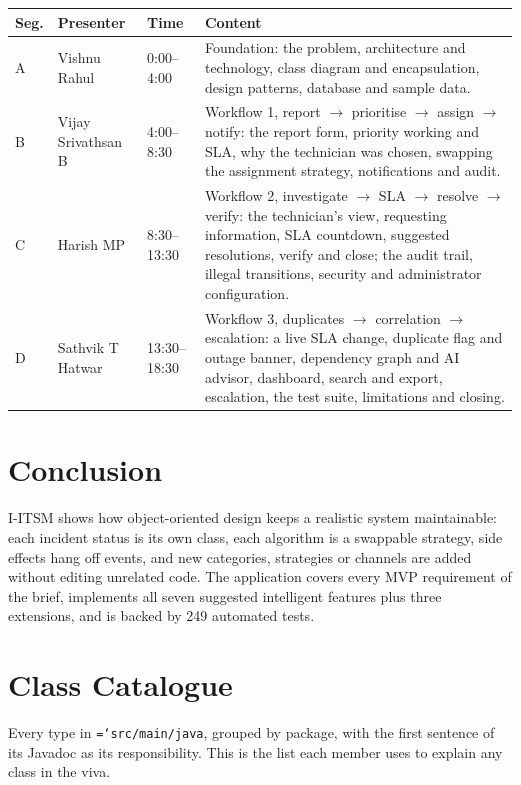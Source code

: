 \documentclass[11pt,a4paper]{article}
\newcommand{\code}[1]{\texttt{\hyphenchar\font=`\-\relax #1}}
\begin{document}
\begin{tabularx}{\linewidth}{@{}L{0.9cm}L{3.3cm}L{2.1cm}Y@{}}
\toprule
\textbf{Seg.} & \textbf{Presenter} & \textbf{Time} & \textbf{Content} \\
\midrule
A & Vishnu Rahul & 0:00--4:00 & Foundation: the problem, architecture and technology, class diagram and encapsulation, design patterns, database and sample data. \\
B & Vijay Srivathsan B & 4:00--8:30 & Workflow 1, report $\rightarrow$ prioritise $\rightarrow$ assign $\rightarrow$ notify: the report form, priority working and SLA, why the technician was chosen, swapping the assignment strategy, notifications and audit. \\
C & Harish MP & 8:30--13:30 & Workflow 2, investigate $\rightarrow$ SLA $\rightarrow$ resolve $\rightarrow$ verify: the technician's view, requesting information, SLA countdown, suggested resolutions, verify and close; the audit trail, illegal transitions, security and administrator configuration. \\
D & Sathvik T Hatwar & 13:30--18:30 & Workflow 3, duplicates $\rightarrow$ correlation $\rightarrow$ escalation: a live SLA change, duplicate flag and outage banner, dependency graph and AI advisor, dashboard, search and export, escalation, the test suite, limitations and closing. \\
\bottomrule
\end{tabularx}

\section{Conclusion}
I-ITSM shows how object-oriented design keeps a realistic system maintainable: each incident status is its own class, each algorithm is a swappable strategy, side effects hang off events, and new categories, strategies or channels are added without editing unrelated code. The application covers every MVP requirement of the brief, implements all seven suggested intelligent features plus three extensions, and is backed by 249 automated tests.

\clearpage
\appendix
\renewcommand{\thesection}{\Alph{section}}
\section{Class Catalogue}\label{app:classes}
Every type in \code{src/main/java}, grouped by package, with the first sentence of its Javadoc as its responsibility. This is the list each member uses to explain any class in the viva.
{\small}
\end{document}
